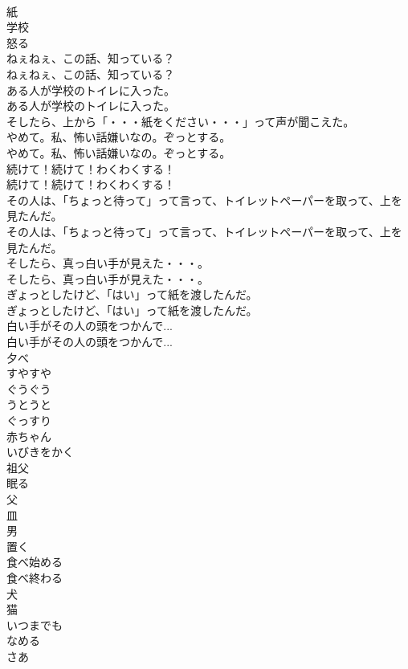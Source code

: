 \documentclass[8pt]{extreport}
\begin{document}
\begin{CJK}{UTF8}{min}
\\	紙
\\	学校
\\	怒る
\\	ねぇねぇ、この話、知っている？	
\\	ねぇねぇ、この話、知っている？ 
\\	ある人が学校のトイレに入った。	
\\	ある人が学校のトイレに入った。 
\\	そしたら、上から「・・・紙をください・・・」って声が聞こえた。 
\\	やめて。私、怖い話嫌いなの。ぞっとする。	
\\	やめて。私、怖い話嫌いなの。ぞっとする。 
\\	続けて！続けて！わくわくする！	
\\	続けて！続けて！わくわくする！ 
\\	その人は、「ちょっと待って」って言って、トイレットペーパーを取って、上を見たんだ。	
\\	その人は、「ちょっと待って」って言って、トイレットペーパーを取って、上を見たんだ。 
\\	そしたら、真っ白い手が見えた・・・。	
\\	そしたら、真っ白い手が見えた・・・。 
\\	ぎょっとしたけど、「はい」って紙を渡したんだ。	
\\	ぎょっとしたけど、「はい」って紙を渡したんだ。 
\\	白い手がその人の頭をつかんで...	
\\	白い手がその人の頭をつかんで... 
\\	夕べ
\\	すやすや
\\	ぐうぐう
\\	うとうと
\\	ぐっすり
\\	赤ちゃん
\\	いびきをかく
\\	祖父
\\	眠る
\\	父
\\	皿
\\	男
\\	置く
\\	食べ始める
\\	食べ終わる
\\	犬
\\	猫
\\	いつまでも
\\	なめる
\\	さあ

\end{CJK}
\end{document}
